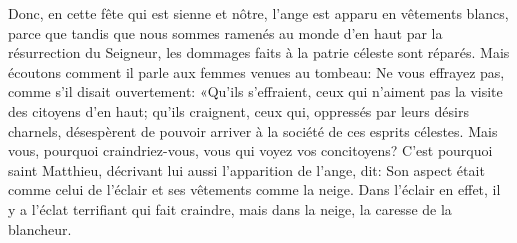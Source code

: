 Donc, en cette fête qui est sienne et nôtre,
	l’ange est apparu en vêtements blancs,
	parce que tandis que nous sommes ramenés au monde d’en haut
		par la résurrection du Seigneur,
	les dommages faits à la patrie céleste sont réparés.
Mais écoutons comment il parle aux femmes venues au tombeau:
	Ne vous effrayez pas, comme s’il disait ouvertement:
	«Qu’ils s’effraient, ceux qui n’aiment pas la visite des citoyens d’en haut;
	qu’ils craignent, ceux qui, oppressés par leurs désirs charnels,
	désespèrent de pouvoir arriver à la société de ces esprits célestes.
Mais vous, pourquoi craindriez-vous, vous qui voyez vos concitoyens?
C’est pourquoi saint Matthieu, décrivant lui aussi l’apparition de l’ange, dit:
	Son aspect était comme celui de l’éclair et ses vêtements comme la neige.
Dans l’éclair en effet, il y a l’éclat terrifiant qui fait craindre,
	mais dans la neige, la caresse de la blancheur.
